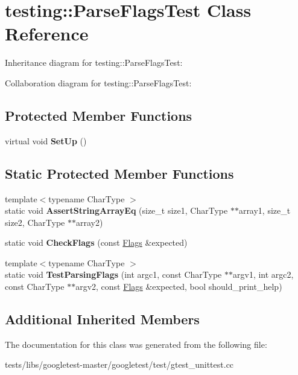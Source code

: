 \hypertarget{classtesting_1_1ParseFlagsTest}{}\section{testing\+:\+:Parse\+Flags\+Test Class Reference}
\label{classtesting_1_1ParseFlagsTest}


Inheritance diagram for testing\+:\+:Parse\+Flags\+Test\+:


Collaboration diagram for testing\+:\+:Parse\+Flags\+Test\+:
\subsection*{Protected Member Functions}
\begin{DoxyCompactItemize}
\item 
\mbox{\label{classtesting_1_1ParseFlagsTest_a72fd683f0bc0c2701d9a183c6b20cb48}} 
virtual void {\bfseries Set\+Up} ()
\end{DoxyCompactItemize}
\subsection*{Static Protected Member Functions}
\begin{DoxyCompactItemize}
\item 
\mbox{\label{classtesting_1_1ParseFlagsTest_a5d93780e65e1aa304334a8d4372c51fc}} 
{\footnotesize template$<$typename Char\+Type $>$ }\\static void {\bfseries Assert\+String\+Array\+Eq} (size\+\_\+t size1, Char\+Type $\ast$$\ast$array1, size\+\_\+t size2, Char\+Type $\ast$$\ast$array2)
\item 
\mbox{\label{classtesting_1_1ParseFlagsTest_a5919553c35ebe3910fcff51cc0b59fd6}} 
static void {\bfseries Check\+Flags} (const \hyperlink{structtesting_1_1Flags}{Flags} \&expected)
\item 
\mbox{\label{classtesting_1_1ParseFlagsTest_ad769e5f5a71939c3a9ad853b415fa9d2}} 
{\footnotesize template$<$typename Char\+Type $>$ }\\static void {\bfseries Test\+Parsing\+Flags} (int argc1, const Char\+Type $\ast$$\ast$argv1, int argc2, const Char\+Type $\ast$$\ast$argv2, const \hyperlink{structtesting_1_1Flags}{Flags} \&expected, bool should\+\_\+print\+\_\+help)
\end{DoxyCompactItemize}
\subsection*{Additional Inherited Members}


The documentation for this class was generated from the following file\+:\begin{DoxyCompactItemize}
\item 
tests/libs/googletest-\/master/googletest/test/gtest\+\_\+unittest.\+cc\end{DoxyCompactItemize}
